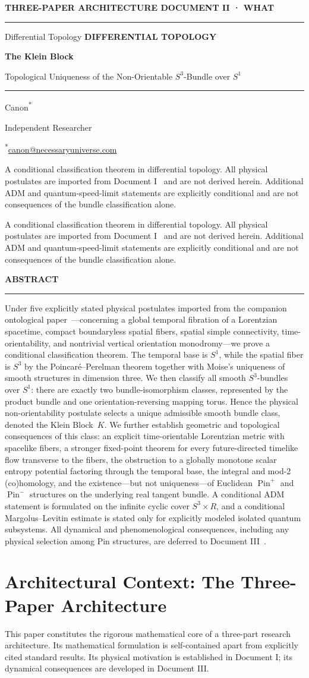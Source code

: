\documentclass[11pt]{article}
\makeatletter
\theoremstyle{canonmath}
\theoremstyle{canonpostulate}
\theoremstyle{canonproposition}
\providecommand{\Klein}{\mathcal{K}}
\providecommand{\R}{\mathbb{R}}
\providecommand{\Sone}{S^1}
\providecommand{\Sthree}{S^3}
\providecommand{\Pin}{\operatorname{Pin}}
\def\mathbb#1{#1}%
\def\mathcal#1{#1}%
\newcommand{\CanonTitlePage}{%
\begin{titlepage}
\thispagestyle{titlepage}
\vspace*{0.62cm}
{\sffamily\footnotesize\bfseries\color{seriesMuted}
THREE-PAPER ARCHITECTURE \hfill \CanonStage\par}
\vspace{0.42cm}
{\color{seriesAccent}\rule{\textwidth}{1.05pt}}\par
\vspace{1.65cm}
\ifx\CanonGenre\empty
\else
{\sffamily\footnotesize\bfseries\color{seriesMuted}\MakeUppercase{\CanonGenre}}\par
\vspace{0.45cm}\fi
{\sffamily\bfseries\fontsize{28}{32}\selectfont\color{seriesInk}\hyphenpenalty=10000\exhyphenpenalty=10000\CanonTitle\par}
\vspace{0.52cm}
{\sffamily\large\color{seriesAccent}\CanonSubtitle\par}
\vspace{0.78cm}
{\color{seriesAccent}\rule{0.24\textwidth}{0.9pt}}\par
\vspace{0.95cm}
{\normalsize\sffamily Canon\textsuperscript{*}\;\orcidlink{0009-0001-9037-6209}\par}
\vspace{0.25cm}
{\small\sffamily\color{seriesMuted}Independent Researcher\par}
\vspace{0.16cm}
{\small\sffamily\color{seriesMuted}\textsuperscript{*}\href{mailto:canon@necessaryuniverse.com}{canon@necessaryuniverse.com}\par}
\vfill
\ifx\CanonDeck\empty
\else
  \begin{tcolorbox}[
    enhanced,
    colback=seriesPaper,
    colframe=seriesRule,
    boxrule=0.45pt,
    leftrule=2.4pt,
    arc=1.5pt,
    left=11pt,right=11pt,top=9pt,bottom=9pt,
    width=0.94\textwidth
  ]
  \small\sffamily\color{seriesMuted}
  \CanonDeck
  \end{tcolorbox}
  \vspace{0.65cm}
\fi

\end{titlepage}
}
\newenvironment{CanonAbstract}{%
  \begin{center}
  {\sffamily\footnotesize\bfseries\color{seriesMuted}\MakeUppercase{Abstract}}\\[-0.05em]
  {\color{seriesAccent}\rule{0.16\textwidth}{0.75pt}}
  \end{center}
  \begin{tcolorbox}[
    enhanced,
    breakable,
    colback=white,
    colframe=seriesRule,
    boxrule=0.4pt,
    leftrule=2.2pt,
    arc=1pt,
    left=12pt,right=12pt,top=9pt,bottom=9pt,
    before skip=5pt,after skip=4pt
  ]
  \small
}{%
  \end{tcolorbox}
}
\newcommand{\CanonStage}{DOCUMENT II · WHAT}
\newcommand{\CanonGenre}{Differential Topology}
\newcommand{\CanonTitle}{The Klein Block}
\newcommand{\CanonSubtitle}{Topological Uniqueness of the Non-Orientable $S^3$-Bundle over $S^1$}
\newcommand{\CanonDeck}{A conditional classification theorem in differential topology. All physical postulates are imported from Document I~\cite{CanonWhy} and are not derived herein. Additional ADM and quantum-speed-limit statements are explicitly conditional and are not consequences of the bundle classification alone.}
\makeatother
\begin{document}
\CanonTitlePage

\setcounter{page}{1}

\begin{CanonAbstract}
Under five explicitly stated physical postulates imported from the companion ontological paper~\cite{CanonWhy}---concerning a global temporal fibration of a Lorentzian spacetime, compact boundaryless spatial fibers, spatial simple connectivity, time-orientability, and nontrivial vertical orientation monodromy---we prove a conditional classification theorem. The temporal base is $\Sone$, while the spatial fiber is $\Sthree$ by the Poincar\'e--Perelman theorem together with Moise's uniqueness of smooth structures in dimension three. We then classify all smooth $\Sthree$-bundles over $\Sone$: there are exactly two bundle-isomorphism classes, represented by the product bundle and one orientation-reversing mapping torus. Hence the physical non-orientability postulate selects a unique admissible smooth bundle class, denoted the Klein Block~$\Klein$. We further establish geometric and topological consequences of this class: an explicit time-orientable Lorentzian metric with spacelike fibers, a stronger fixed-point theorem for every future-directed timelike flow transverse to the fibers, the obstruction to a globally monotone scalar entropy potential factoring through the temporal base, the integral and mod-2 (co)homology, and the existence---but not uniqueness---of Euclidean $\Pin^+$ and $\Pin^-$ structures on the underlying real tangent bundle. A conditional ADM statement is formulated on the infinite cyclic cover $\Sthree\times\R$, and a conditional Margolus--Levitin estimate is stated only for explicitly modeled isolated quantum subsystems. All dynamical and phenomenological consequences, including any physical selection among Pin structures, are deferred to Document III~\cite{CanonHow}.
\end{CanonAbstract}

\section*{Architectural Context: The Three-Paper Architecture}
This paper constitutes the rigorous mathematical core of a three-part research architecture. Its mathematical formulation is self-contained apart from explicitly cited standard results. Its physical motivation is established in Document I; its dynamical consequences are developed in Document III.
\end{document}

